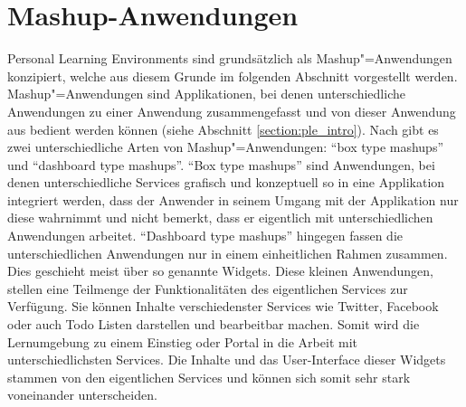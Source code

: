 \section{Mashup-Anwendungen}\label{section:mashup_anwendungen}
Personal Learning Environments sind grundsätzlich als Mashup"=Anwendungen konzipiert, welche aus diesem Grunde im folgenden Abschnitt vorgestellt werden. Mashup"=Anwendungen sind Applikationen, bei denen unterschiedliche Anwendungen zu einer Anwendung zusammengefasst und von dieser Anwendung aus bedient werden können (siehe Abschnitt \ref{section:ple_intro}). Nach \cite{Soylu2011} gibt es zwei unterschiedliche Arten von Mashup"=Anwendungen: "`box type mashups"' und "`dashboard type mashups"'. "`Box type mashups"' sind Anwendungen, bei denen unterschiedliche Services grafisch und konzeptuell so in eine Applikation integriert werden, dass der Anwender in seinem Umgang mit der Applikation nur diese wahrnimmt und nicht bemerkt, dass er eigentlich mit unterschiedlichen Anwendungen arbeitet. "`Dashboard type mashups"' hingegen fassen die unterschiedlichen Anwendungen nur in einem einheitlichen Rahmen zusammen. Dies geschieht meist über so genannte Widgets. Diese kleinen Anwendungen, stellen eine Teilmenge der Funktionalitäten des eigentlichen Services zur Verfügung. Sie können Inhalte verschiedenster Services wie Twitter, Facebook oder auch Todo Listen darstellen und bearbeitbar machen. Somit wird die Lernumgebung zu einem Einstieg oder Portal in die Arbeit mit unterschiedlichsten Services.  Die Inhalte und das User-Interface dieser Widgets stammen von den eigentlichen Services und können sich somit sehr stark voneinander unterscheiden. 

